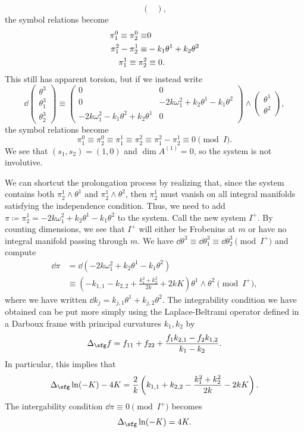 \begin{example}
\[\begin{pmatrix}
    \end{pmatrix},
    \]
    the symbol relations become 
    \begin{align}
        \pi^0_1\equiv \pi^0_2\equiv& 0 \notag\\
        \pi^2_1-\pi^1_2\equiv& -k_1\theta^1+k_2\theta^2\notag\\
        \pi^1_1\equiv \pi^2_2&\equiv 0.
    \end{align}
    This still has apparent torsion, but if we instead write 
    \[\dd\begin{pmatrix}
        \theta^3\\\theta^3_1\\\theta^3_2
    \end{pmatrix}\equiv 
    \begin{pmatrix}
        0 & 0\\
        0 & -2k\omega^2_1+k_2\theta^1-k_1\theta^2\\
        -2k\omega^2_1-k_1\theta^2+k_2\theta^1 & 0
    \end{pmatrix}
    \wedge \begin{pmatrix}
        \theta^1\\\theta^2
    \end{pmatrix},
    \]
    the symbol relations become 
    \[\pi^0_1\equiv \pi^0_2\equiv\pi^1_1\equiv\pi^2_2\equiv \pi^2_1-\pi^1_2\equiv 0\pmod{I}.\]
    We see that $(s_1,s_2)=(1,0)$ and $\dim A^{(1)}=0$, so the system is not involutive.

    We can shortcut the prolongation process by realizing that, since the system contains both $\pi^1_2\wedge\theta^1$ and $\pi^1_2\wedge\theta^2$, then $\pi^1_2$ must vanish on all integral manifolds satisfying the independence condition. Thus, we need to add $\pi\coloneqq \pi^1_2=-2k\omega^2_1+k_2\theta^1-k_1\theta^2$ to the system. Call the new system $I^+$. By counting dimensions, we see that $I^+$ will either be Frobenius at $m$ or have no integral manifold passing through $m$. We have $\dd\theta^3\equiv \dd\theta^3_1\equiv \dd\theta^3_2\pmod{I^+}$ and compute 
    \begin{align}
        \dd\pi&=\dd(-2k\omega^2_1+k_2\theta^1-k_1\theta^2)\\
        &\equiv \left(-k_{1,1}-k_{2,2}+\frac{k_1^2+k_2^2}{2k}+2kK\right)\theta^1\wedge\theta^2 \pmod{I^+},
    \end{align}
    where we have written $\dd k_j=k_{j,1}\theta^1+k_{j,2}\theta^2$. The integrability condition we have obtained can be put more simply using the Laplace-Beltrami operator defined in a Darboux frame with principal curvatures $k_1,k_2$ by
    \[\Delta_{\sfg} f = f_{11}+f_{22}+\frac{f_1k_{2,1}-f_2k_{1,2}}{k_1-k_2}.\]
    In particular, this implies that
    \[\Delta_{\sfg} \ln(-K)-4K=\frac{2}{k}\left(k_{1,1}+k_{2,2}-\frac{k_1^2+k_2^2}{2k}-2kK\right).\]
    The intergability condition $\dd\pi\equiv 0\pmod{I^+}$ becomes
    \[\Delta_{\sfg}\ln(-K)=4K.\]
\end{example}

